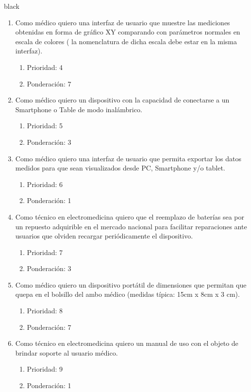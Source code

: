 \documentclass[11pt]{charter}
\begin{document}
\begin{consigna}{black}
\begin{enumerate}
\item Como médico quiero una interfaz de usuario que muestre las mediciones obtenidas en forma de  gráfico XY comparando con parámetros normales en escala de colores ( la nomenclatura de dicha escala debe estar en la misma interfaz).
\begin{enumerate}
	\item Prioridad: 4
	\item Ponderación: 7
\end{enumerate}
\item Como médico quiero  un dispositivo con la capacidad de conectarse a un Smartphone o Table de modo inalámbrico.
\begin{enumerate}
	\item Prioridad: 5
	\item Ponderación: 3
\end{enumerate}
\item Como médico quiero una interfaz de usuario que permita exportar los datos medidos para que sean visualizados desde PC, Smartphone y/o tablet.
\begin{enumerate}
	\item Prioridad: 6
	\item Ponderación: 1
\end{enumerate}
\item Como técnico en electromedicina quiero que el reemplazo de baterías sea por un repuesto adquirible en el mercado nacional para facilitar reparaciones ante usuarios que olviden recargar periódicamente el dispositivo.
\begin{enumerate}
	\item Prioridad: 7
	\item Ponderación: 3
\end{enumerate}
\item Como médico quiero un dispositivo portátil de dimensiones que permitan que quepa en el bolsillo del ambo médico (medidas típica: 15cm x 8cm x 3 cm).
\begin{enumerate}
	\item Prioridad: 8
	\item Ponderación: 7
\end{enumerate}

\item Como técnico en electromedicina quiero un manual de uso con el objeto de brindar soporte al usuario médico.
\begin{enumerate}
	\item Prioridad: 9
	\item Ponderación: 1
\end{enumerate}
\end{enumerate}
\end{consigna}
\end{document}
